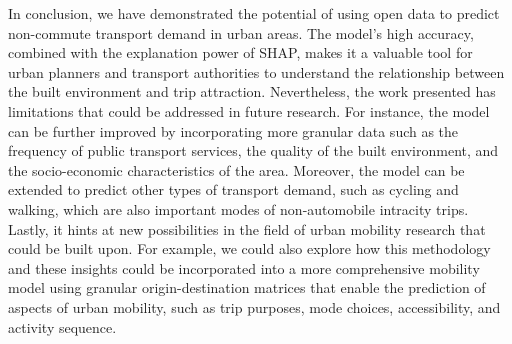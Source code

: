 In conclusion, we have demonstrated the potential of using open data to predict non-commute transport demand in urban areas. The model's high accuracy, combined with the explanation power of SHAP, makes it a valuable tool for urban planners and transport authorities to understand the relationship between the built environment and trip attraction. Nevertheless, the work presented has limitations that could be addressed in future research. For instance, the model can be further improved by incorporating more granular data such as the frequency of public transport services, the quality of the built environment, and the socio-economic characteristics of the area. Moreover, the model can be extended to predict other types of transport demand, such as cycling and walking, which are also important modes of non-automobile intracity trips. Lastly, it hints at new possibilities in the field of urban mobility research that could be built upon. For example, we could also explore how this methodology and these insights could be incorporated into a more comprehensive mobility model using granular origin-destination matrices that enable the prediction of aspects of urban mobility, such as trip purposes, mode choices, accessibility, and activity sequence.




